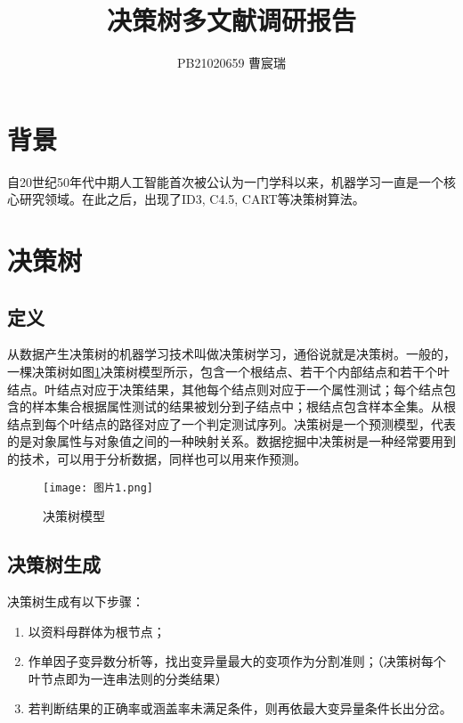 \documentclass[fontset=windows]{article}
\title{\textbf{决策树多文献调研报告}}
\author{PB21020659 曹宸瑞}
\begin{document}
\renewcommand{\figurename}{图}
\maketitle


\begin{abstract}
      


\end{abstract}

\section{背景}

自20世纪50年代中期人工智能首次被公认为一门学科以来，机器学习一直是一个核心研究领域。在此之后，出现了ID3, C4.5, CART等决策树算法。

\section{决策树}

\subsection{定义}

从数据产生决策树的机器学习技术叫做决策树学习，通俗说就是决策树。一般的，一棵决策树如图\ref{fig:1}决策树模型所示，包含一个根结点、若干个内部结点和若干个叶结点。叶结点对应于决策结果，其他每个结点则对应于一个属性测试；每个结点包含的样本集合根据属性测试的结果被划分到子结点中；根结点包含样本全集。从根结点到每个叶结点的路径对应了一个判定测试序列。决策树是一个预测模型，代表的是对象属性与对象值之间的一种映射关系。数据挖掘中决策树是一种经常要用到的技术，可以用于分析数据，同样也可以用来作预测。

\begin{figure}[h]
\centering
\texttt{[image: 图片1.png]}
\caption{\label{fig:1}决策树模型}
\end{figure}

\subsection{决策树生成}

决策树生成有以下步骤：

\begin{enumerate}
      \item 以资料母群体为根节点；
      \item 作单因子变异数分析等，找出变异量最大的变项作为分割准则；（决策树每个叶节点即为一连串法则的分类结果）
      \item 若判断结果的正确率或涵盖率未满足条件，则再依最大变异量条件长出分岔。
\end{enumerate}
\end{document}
